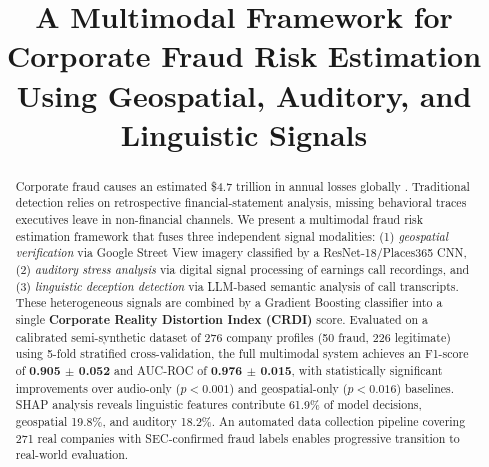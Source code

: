 \documentclass[conference]{IEEEtran}
\begin{document}
\title{A Multimodal Framework for Corporate Fraud Risk Estimation\\
Using Geospatial, Auditory, and Linguistic Signals}

\author{
\and
{}
\and
{}
}

\maketitle

\begin{abstract}
Corporate fraud causes an estimated \$4.7 trillion in annual losses globally
\cite{acfe2024}. Traditional detection relies on retrospective financial-statement
analysis, missing behavioral traces executives leave in non-financial channels.
We present a multimodal fraud risk estimation framework that
fuses three independent signal modalities: (1) \emph{geospatial verification} via
Google Street View imagery classified by a ResNet-18/Places365 CNN,
(2) \emph{auditory stress analysis} via digital signal processing of earnings call
recordings, and (3) \emph{linguistic deception detection} via LLM-based semantic
analysis of call transcripts. These heterogeneous signals are combined by a
Gradient Boosting classifier into a single \textbf{Corporate Reality Distortion
Index (CRDI)} score. Evaluated on a calibrated semi-synthetic dataset of 276
company profiles (50 fraud, 226 legitimate) using 5-fold stratified
cross-validation, the full multimodal system achieves an F1-score of
\textbf{0.905 $\pm$ 0.052} and AUC-ROC of \textbf{0.976 $\pm$ 0.015}, with
statistically significant improvements over audio-only ($p < 0.001$) and
geospatial-only ($p < 0.016$) baselines. SHAP analysis reveals linguistic
features contribute 61.9\% of model decisions, geospatial 19.8\%, and auditory
18.2\%. An automated data collection pipeline covering 271 real companies with
SEC-confirmed fraud labels enables progressive transition to real-world
evaluation.
\end{abstract}
\end{document}

